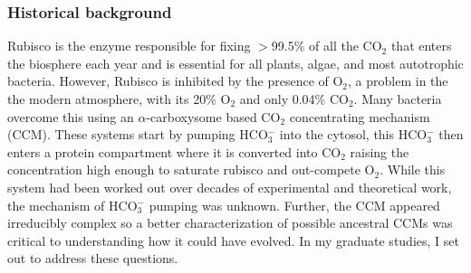 \documentclass{article}
\begin{document}
\subsubsection{Historical background}
Rubisco is the enzyme responsible for fixing $>$99.5\% of all the CO$_2$ that enters the biosphere each year and is essential for all plants, algae, and most autotrophic bacteria. 
However, Rubisco is inhibited by the presence of O$_2$, a problem in the the modern atmosphere, with its 20\% O$_2$ and only 0.04\% CO$_2$.
Many bacteria overcome this using an $\alpha$-carboxysome based CO$_2$ concentrating mechanism (CCM).
These systems start by pumping HCO$_{3}^{-}$ into the cytosol, this HCO$_{3}^{-}$ then enters a protein compartment where it is converted into CO$_2$ raising the concentration high enough to saturate rubisco and out-compete O$_2$.
While this system had been worked out over decades of experimental and theoretical work, the mechanism of HCO$_{3}^{-}$ pumping was unknown.
Further, the CCM appeared irreducibly complex so a better characterization of possible ancestral CCMs was critical to understanding how it could have evolved.
In my graduate studies, I set out to address these questions.
%
\end{document}
